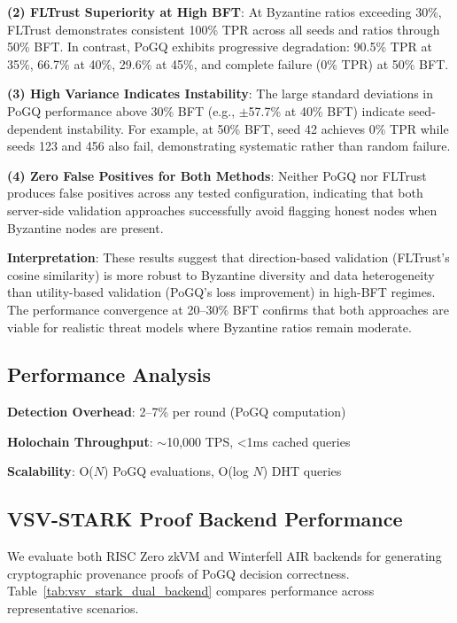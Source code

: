 \textbf{(2) FLTrust Superiority at High BFT}: At Byzantine ratios exceeding 30\%, FLTrust demonstrates consistent 100\% TPR across all seeds and ratios through 50\% BFT. In contrast, PoGQ exhibits progressive degradation: 90.5\% TPR at 35\%, 66.7\% at 40\%, 29.6\% at 45\%, and complete failure (0\% TPR) at 50\% BFT.

\textbf{(3) High Variance Indicates Instability}: The large standard deviations in PoGQ performance above 30\% BFT (e.g., $\pm$57.7\% at 40\% BFT) indicate seed-dependent instability. For example, at 50\% BFT, seed 42 achieves 0\% TPR while seeds 123 and 456 also fail, demonstrating systematic rather than random failure.

\textbf{(4) Zero False Positives for Both Methods}: Neither PoGQ nor FLTrust produces false positives across any tested configuration, indicating that both server-side validation approaches successfully avoid flagging honest nodes when Byzantine nodes are present.

\textbf{Interpretation}: These results suggest that direction-based validation (FLTrust's cosine similarity) is more robust to Byzantine diversity and data heterogeneity than utility-based validation (PoGQ's loss improvement) in high-BFT regimes. The performance convergence at 20--30\% BFT confirms that both approaches are viable for realistic threat models where Byzantine ratios remain moderate.

\subsection{Performance Analysis}

\textbf{Detection Overhead}: 2--7\% per round (PoGQ computation)

\textbf{Holochain Throughput}: $\sim$10,000 TPS, <1ms cached queries

\textbf{Scalability}: O($N$) PoGQ evaluations, O(log $N$) DHT queries

\subsection{VSV-STARK Proof Backend Performance}

We evaluate both RISC Zero zkVM and Winterfell AIR backends for generating cryptographic provenance proofs of PoGQ decision correctness. Table~\ref{tab:vsv_stark_dual_backend} compares performance across representative scenarios.

